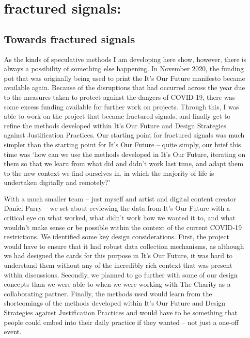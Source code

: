 \chapter{fractured signals: }
\label{}

\section{Towards fractured signals}
\label{sec:}

As the kinds of speculative methods I am developing here show, however, there is always a possibility of something else happening. In November 2020, the funding pot that was originally being used to print the It’s Our Future manifesto became available again. Because of the disruptions that had occurred across the year due to the measures taken to protect against the dangers of COVID-19,  there was some excess funding available for further work on projects. Through this, I was able to work on the project that became fractured signals, and finally get to refine the methods developed within It’s Our Future and Design Strategies against Justification Practices. Our starting point for fractured signals was much simpler than the starting point for It’s Our Future – quite simply, our brief this time was ‘how can we use the methods developed in It’s Our Future, iterating on them so that we learn from what did and didn’t work last time, and adapt them to the new context we find ourselves in, in which the majority of life is undertaken digitally and remotely?’

With a much smaller team – just myself and artist and digital content creator Daniel Parry – we set about reviewing the data from It’s Our Future with a critical eye on what worked, what didn’t work how we wanted it to, and what wouldn’t make sense or be possible within the context of the current COVID-19 restrictions.  We identified some key design considerations. First, the project would have to ensure that it had robust data collection mechanisms, as although we had designed the cards for this purpose in It’s Our Future, it was hard to understand them without any of the incredibly rich context that was present within discussions. Secondly, we planned to go further with some of our design concepts than we were able to when we were working with The Charity as a collaborating partner. Finally, the methods used would learn from the shortcomings of the methods developed within It’s Our Future and Design Strategies against Justification Practices and would have to be something that people could embed into their daily practice if they wanted – not just a one-off event. 

